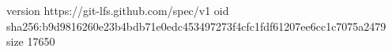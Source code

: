 version https://git-lfs.github.com/spec/v1
oid sha256:b9d9816260e23b4bdb71e0edc453497273f4cfc1fdf61207ee6cc1c7075a2479
size 17650
